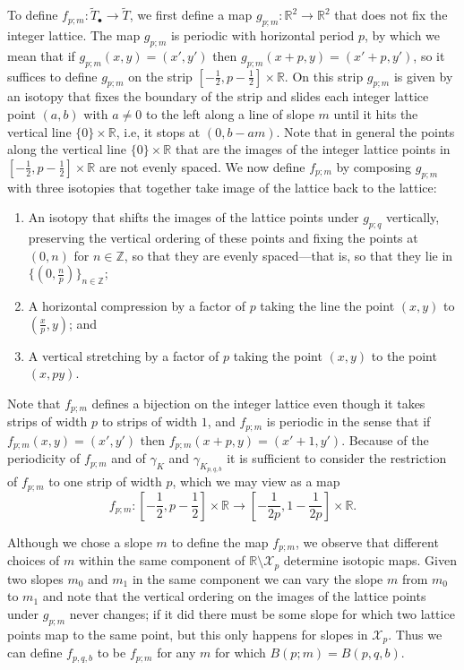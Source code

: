 \documentclass{amsart}
\newcommand{\Z}{\mathbb{Z}}
\newcommand{\R}{\mathbb{R}}
\theoremstyle{definition}
\theoremstyle{remark}
\numberwithin{equation}{section}
\numberwithin{equation}{section} \makeatletter
\begin{document}
To define $f_{p;m}: \widetilde{T}_{\bullet} \rightarrow \widetilde{T}$, we first define a map $g_{p;m}:\R^2 \to \R^2$ that does not fix the integer lattice. The map $g_{p;m}$ is periodic with horizontal period $p$, by which we mean that if $g_{p;m}(x, y) = (x',y')$ then $g_{p;m}(x+p, y) = (x'+p,y')$, so it suffices to define $g_{p;m}$ on the strip $[-\frac 1 2, p-\frac 1 2] \times \R$. On this strip $g_{p;m}$ is given by an isotopy that fixes the boundary of the strip and slides each integer lattice point $(a,b)$ with $a\neq 0$ to the left along a line of slope $m$ until it hits the vertical line $\{0\}\times \R$, i.e, it stops at $(0,b-am)$. Note that in general the points along the vertical line $\{0\}\times \R$ that are the images of the integer lattice points in $[-\frac 1 2, p-\frac 1 2] \times \R$ are not evenly spaced. We now define $f_{p;m}$ by composing $g_{p;m}$ with three isotopies that together take image of the lattice back to the lattice:
 \begin{enumerate}
	 \item An isotopy that shifts the images of the lattice points under $g_{p;q}$ vertically, preserving the vertical ordering of these points and fixing the points at $(0,n)$ for $n\in \Z$, so that they are evenly spaced---that is, so that they lie in $\{ (0, \frac{n}{p} ) \}_{n\in\Z}$;
	 \item A horizontal compression by a factor of $p$ taking the line the point $(x,y)$ to $(\frac x p, y)$; and
	 \item A vertical stretching by a factor of $p$ taking the point $(x,y)$ to the point $(x, py)$.
 \end{enumerate}
Note that $f_{p;m}$ defines a bijection on the integer lattice even though it takes strips of width $p$ to strips of width $1$, and $f_{p;m}$ is periodic in the sense that if $f_{p;m}(x, y) = (x',y')$ then $f_{p;m}(x+p, y) = (x'+1,y')$. Because of the periodicity of $f_{p;m}$ and of $\gamma_K$ and $\gamma_{K_{p,q,b}}$ it is sufficient to consider the restriction of $f_{p;m}$ to one strip of width $p$, which we may view as a map 
$$f_{p;m}: [-\frac 1 2, p-\frac 1 2] \times \R \to [-\frac{1}{2p}, 1-\frac{1}{2p}] \times \R. $$

Although we chose a slope $m$ to define the map $f_{p;m}$, we observe that different choices of $m$ within the same component of $\R \setminus \mathcal{X}_p$ determine isotopic maps. Given two slopes $m_0$ and $m_1$ in the same component we can vary the slope $m$ from $m_0$ to $m_1$ and note that the vertical ordering on the images of the lattice points under $g_{p;m}$ never changes; if it did there must be some slope for which two lattice points map to the same point, but this only happens for slopes in $\mathcal{X}_p$. Thus we can define $f_{p,q,b}$ to be $f_{p;m}$ for any $m$ for which $B(p;m) = B(p,q,b)$.
\end{document}
